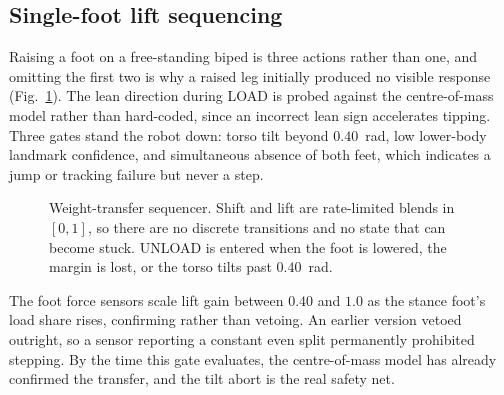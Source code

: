 \documentclass[twocolumn]{article}
\begin{document}
\subsection{Single-foot lift sequencing}

Raising a foot on a free-standing biped is three actions rather than one, and omitting the
first two is why a raised leg initially produced no visible response (Fig.~\ref{fig:liftfsm}).
The lean direction during LOAD is probed against the centre-of-mass model rather than
hard-coded, since an incorrect lean sign accelerates tipping. Three gates stand the robot down:
torso tilt beyond $0.40$~rad, low lower-body landmark confidence, and simultaneous absence of
both feet, which indicates a jump or tracking failure but never a step.

\begin{figure}[H]
\centering
{}
\caption{Weight-transfer sequencer. Shift and lift are rate-limited blends in $[0,1]$, so there
are no discrete transitions and no state that can become stuck. UNLOAD is entered when the foot
is lowered, the margin is lost, or the torso tilts past $0.40$~rad.}
\label{fig:liftfsm}
\end{figure}

The foot force sensors scale lift gain between $0.40$ and $1.0$ as the stance foot's load share
rises, confirming rather than vetoing. An earlier version vetoed outright, so a sensor
reporting a constant even split permanently prohibited stepping. By the time this gate
evaluates, the centre-of-mass model has already confirmed the transfer, and the tilt abort is
the real safety net.
\end{document}
